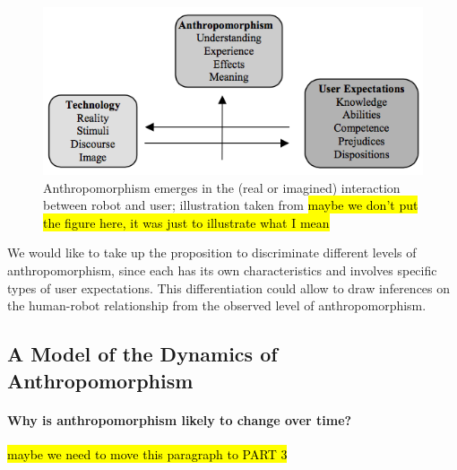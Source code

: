 \documentclass{frontiersSCNS} %
\begin{document}
\begin{figure}[ht!]\centering
  \includegraphics[scale=0.42]{persson_anthropomorphism.png}
 \caption{Anthropomorphism emerges in the (real or imagined) interaction between
 robot and user; illustration taken from \cite{persson_anthropomorphism_2000}
 \hl{maybe we don't put the figure here, it was just to illustrate what I mean}}

 \label{fig:anthropomorphism_and_interaction}       %
 \end{figure}

We would like to take up the proposition to discriminate different levels of
anthropomorphism, since each has its own characteristics and involves specific
types of user expectations. This differentiation could allow to draw inferences
on the human-robot relationship from the observed level of anthropomorphism.



\subsection*{A Model of the Dynamics of Anthropomorphism}
\label{sec:dynamics-model}

\paragraph{Why is anthropomorphism likely to change over time?}
\hl{maybe we need to move this paragraph to PART 3}
\end{document}
